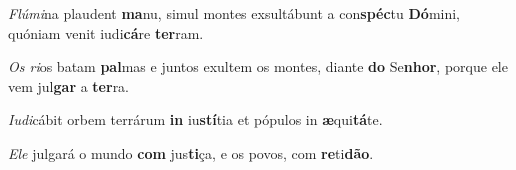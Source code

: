 \begin{greenumerate}
  \switchcolumn*


  \item \textit{Flúmi}na plaudent \textbf{ma}nu, {\GreDagger} simul montes exsultábunt a con\textbf{spéc}tu \textbf{Dó}mini, {\GreStar} quóniam venit iudi\textbf{cá}re \textbf{ter}ram. 

  \switchcolumn%

  \item \textit{Os ri}os batam \textbf{pal}mas {\GreDagger} e juntos exultem os montes, diante \textbf{do} Se\textbf{nhor}, {\GreStar} porque ele vem jul\textbf{gar} a \textbf{ter}ra. 

  \switchcolumn*


  \item \textit{Iudi}cábit orbem terrárum \textbf{in} iu\textbf{stí}tia {\GreStar} et pópulos in \textbf{æ}qui\textbf{tá}te. 

  \switchcolumn%

  \item \textit{Ele} julgará o mundo \textbf{com} jus\textbf{ti}ça, {\GreStar} e os povos, com \textbf{re}ti\textbf{dão}. 
\end{greenumerate}